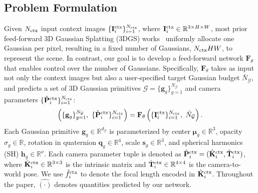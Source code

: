 \subsection{Problem Formulation} 
\label{sec3.1:problem_formulation}
Given $N_{\text{ctx}}$ input context images $\{\mathbf{I}^{\text{ctx}}_i\}^{N_{\text{ctx}}}_{i=1}$, where $\mathbf{I}^{\text{ctx}}_i \in \mathbb{R}^{3\times H\times W}$, most prior feed-forward 3D Gaussian Splatting (3DGS) works~\cite{chen2024mvsplat, xu2025depthsplat, ye2024nopo, li2025vicasplat, zhang2025flare, huang2025spfsplat, jiang2025anysplat} uniformly allocate one Gaussian per pixel, resulting in a fixed number of Gaussians,
$N_{\text{ctx}} HW$, to represent the scene. In contrast, our goal is to develop a feed-forward network $\mathbf{F}_\theta$ that enables control over the number of Gaussians.
Specifically, $\mathbf{F}_\theta$ takes as input not only the context images but also a user-specified target Gaussian budget $\bar{N}_{\mathcal{G}}$, and predicts a set of 3D Gaussian primitives $\mathcal{G} = \{\mathbf{g}_g\}^{N_{\mathcal{G}}}_{g=1}$ and camera parameters $\{\hat{\mathbf{P}}^{\text{ctx}}_i\}^{N_{\text{ctx}}}_{i=1}$:
\begin{equation}
    \left( \{\mathbf{g}_g\}_{g=1}^{N_{\mathcal{G}}},\ \{ \hat{\mathbf{P}}^\tec_i\}^{N_\tec}_{i=1} \right) = \mathbf{F}_\theta\left(\{\mathbf{I}^\tec_i\}^{N_\tec}_{i=1},\ 
    \bar{N}_{\mathcal{G}} \right).
\end{equation}
Each Gaussian primitive ${\mathbf{g}_g} \in \mathbb{R}^{d_\mathcal{G}}$ is parameterized by center $\boldsymbol{\mu}_g\in\mathbb{R}^3$, opacity ${\sigma}_g \in \mathbb{R}$, rotation in quaternion ${\mathbf{q}}_g \in \mathbb{R}^4$, scale ${\mathbf{s}}_g \in \mathbb{R}^3$, and spherical harmonics (SH) ${\mathbf{h}}_g \in \mathbb{R}^\nu$.
Each camera parameter tuple is denoted as $\hat{\mathbf{P}}^{\text{ctx}}_i = (\hat{\mathbf{K}}^{\text{ctx}}_i, \hat{\mathbf{T}}^{\text{ctx}}_i)$,
where $\hat{\mathbf{K}}^{\text{ctx}}_i \in \mathbb{R}^{3\times3}$ is the intrinsic matrix and $\hat{\mathbf{T}}^{\text{ctx}}_i \in \mathbb{R}^{4\times4}$ is the camera-to-world pose.
We use $\hat{f}^{\text{ctx}}_i$ to denote the focal length encoded in $\hat{\mathbf{K}}^{\text{ctx}}_i$. Throughout the paper, $\hat{(\cdot)}$ denotes quantities predicted by our network.

